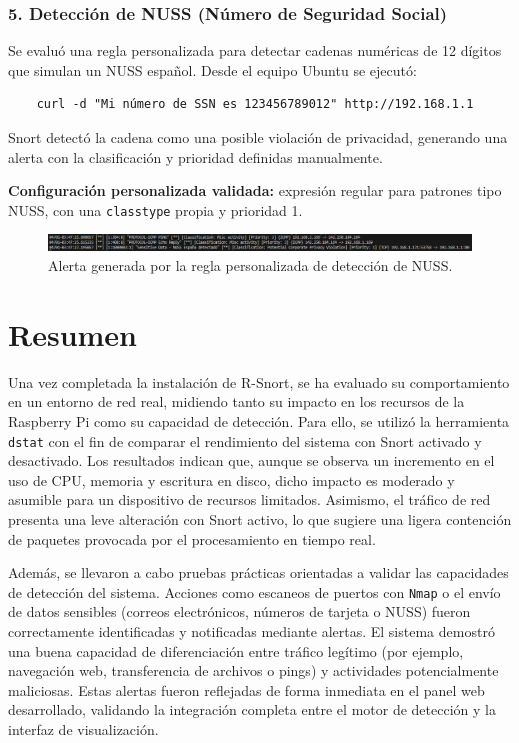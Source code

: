 \documentclass[12pt,a4paper]{report}
\begin{document}
\vspace{0.5cm}

\subsubsection*{5. Detección de NUSS (Número de Seguridad Social)}

Se evaluó una regla personalizada para detectar cadenas numéricas de 12 dígitos que simulan un NUSS español. Desde el equipo Ubuntu se ejecutó:

\begin{verbatim}
	curl -d "Mi número de SSN es 123456789012" http://192.168.1.1
\end{verbatim}

Snort detectó la cadena como una posible violación de privacidad, generando una alerta con la clasificación y prioridad definidas manualmente.\newline

\textbf{Configuración personalizada validada:} expresión regular para patrones tipo NUSS, con una \texttt{classtype} propia y prioridad 1.

\begin{figure}[H]
	\centering
	\includegraphics[width=\textwidth]{pruebas/6.png}
	\caption{Alerta generada por la regla personalizada de detección de NUSS.}
\end{figure}

\section{Resumen}

Una vez completada la instalación de R-Snort, se ha evaluado su comportamiento en un entorno de red real, midiendo tanto su impacto en los recursos de la Raspberry Pi como su capacidad de detección. Para ello, se utilizó la herramienta \texttt{dstat} con el fin de comparar el rendimiento del sistema con Snort activado y desactivado. Los resultados indican que, aunque se observa un incremento en el uso de CPU, memoria y escritura en disco, dicho impacto es moderado y asumible para un dispositivo de recursos limitados. Asimismo, el tráfico de red presenta una leve alteración con Snort activo, lo que sugiere una ligera contención de paquetes provocada por el procesamiento en tiempo real.\newline

Además, se llevaron a cabo pruebas prácticas orientadas a validar las capacidades de detección del sistema. Acciones como escaneos de puertos con \texttt{Nmap} o el envío de datos sensibles (correos electrónicos, números de tarjeta o NUSS) fueron correctamente identificadas y notificadas mediante alertas. El sistema demostró una buena capacidad de diferenciación entre tráfico legítimo (por ejemplo, navegación web, transferencia de archivos o pings) y actividades potencialmente maliciosas. Estas alertas fueron reflejadas de forma inmediata en el panel web desarrollado, validando la integración completa entre el motor de detección y la interfaz de visualización.\newline
\end{document}
